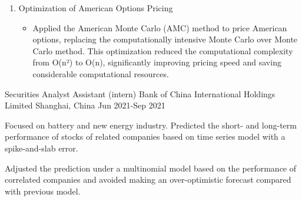 \begin{cventries}
{\begin{enumerate}
\begin{itemize}
          \item Employed SFT VaR-based models to calculate and monitor Counterparty Credit Risk.
          \item Interpreted complex data and model results to deliver clear insights to stakeholders, including cross-disciplinary teams and non-technical audiences.
          \item Continuously updated model parameters in line with evolving market data, ensuring the models reflect current market conditions and deliver accurate risk assessments.
        \end{itemize}
        \item Optimization of American Options Pricing
        \begin{itemize}
          \item Applied the American Monte Carlo (AMC) method to price American options, replacing the computationally intensive Monte Carlo over Monte Carlo method. This optimization reduced the computational complexity from O(n²) to O(n), significantly improving pricing speed and saving considerable computational resources.
        \end{itemize}
      \end{enumerate}
    }

  \cventry
    {Securities Analyst Assistant (intern)} %
    {Bank of China International Holdings Limited} %
    {Shanghai, China} %
    {Jun 2021-Sep 2021} %
    {
      \begin{cvitems} %
        \item {Focused on battery and new energy industry. Predicted the short- and long-term performance of stocks of related companies based on time series model with a spike-and-slab error.}
        \item {Adjusted the prediction under a multinomial model based on the performance of correlated companies and avoided making an over-optimistic forecast compared with previous model.}
      \end{cvitems}
    }


\end{cventries}
